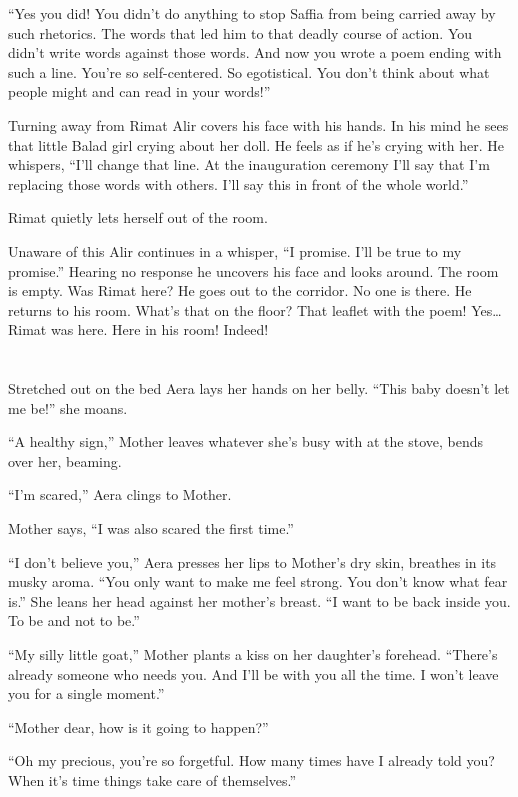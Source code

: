 \documentclass[twoside,11pt,openany]{book}
\begin{document}
``Yes you did! You didn't do anything to stop Saffia from being carried away by such rhetorics. The words
that led him to that deadly course of action. You didn't write words against those words. And now you wrote a poem
ending with such a line. You're so self-centered. So
egotistical.{ }You don't think about what people might and can read
in your words!''

Turning away from Rimat Alir covers his face with his hands. In his mind he sees that little Balad girl crying about her
doll. He feels as if he's crying with her.  He whispers, ``I'll change that line. At the inauguration
ceremony I'll say that I'm replacing those words with others.  I'll say this in front of the whole
world.''

Rimat quietly lets herself out of the room.

Unaware of this Alir continues in a whisper, ``I promise.  I'll be true to my promise.''
Hearing no response he uncovers his face and looks around. The room is empty. Was Rimat here? He goes out to the
corridor. No one is there. He returns to his room. What's that on the floor? That leaflet with the poem! Yes{\ldots}Rimat
was here. Here in his room! Indeed!


\chapter{}

Stretched out on the bed Aera lays her hands on her belly. ``This baby doesn't let me be!''
she moans.

``A healthy sign,'' Mother leaves whatever she's busy with at the stove,
bends over her, beaming.

``I'm scared,'' Aera clings to Mother{.}

Mother says, ``I was also scared the{ }first time.''

``I don't believe you,'' Aera presses her lips{ }to Mother's dry skin,
breathes in its musky aroma. ``You only want to make me feel strong. You don't know what fear
is.'' She leans her head against her mother's breast. ``I want to be back inside you. To be
and not to be.''

``My silly little goat,'' Mother plants a kiss on her daughter's forehead.
``There's already someone who needs you. And I'll be with you all the time. I won't leave you for a single
moment.''

``Mother dear, how is it going to happen?''

``Oh my precious, you're so forgetful. How many times have I already told you? When it's time things take
care of themselves.''
\end{document}
